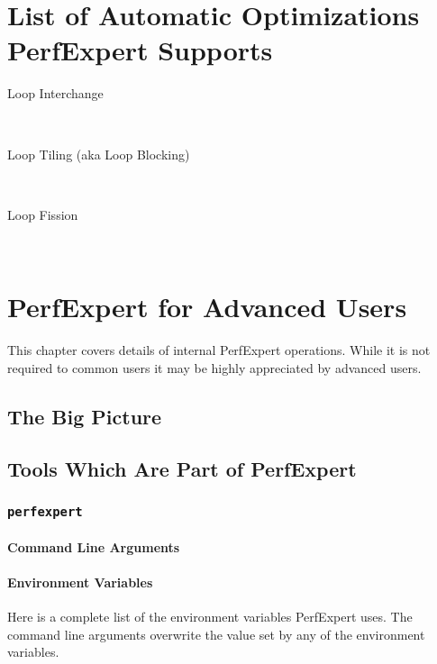 \chapter{List of Automatic Optimizations PerfExpert Supports}

\begin{description}
	\item[Loop Interchange]\hfill \\
	\item[Loop Tiling (aka Loop Blocking)]\hfill \\
	\item[Loop Fission]\hfill \\

\end{description}

\chapter{PerfExpert for Advanced Users}

This chapter covers details of internal PerfExpert operations. While it is not required to common users it may be highly appreciated by advanced users.

\section{The Big Picture}

\section{Tools Which Are Part of PerfExpert}

\subsection{\texttt{perfexpert}}

\subsubsection{Command Line Arguments}

\subsubsection{Environment Variables}

Here is a complete list of the environment variables PerfExpert uses. The command line arguments overwrite the value set by any of the environment variables.


